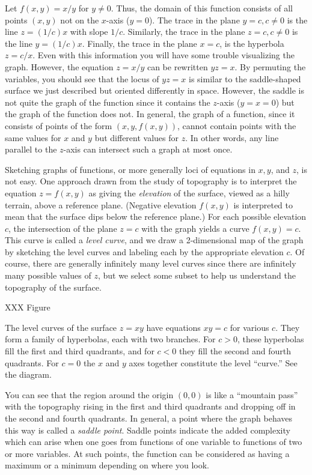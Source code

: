 \begin{example}
	 Let $f(x,y) = x/y$ for $y \not= 0$.  Thus, the domain of this
	function consists of all points $(x,y)$ not on the $x$-axis
	($y = 0$).
	The trace in the plane $y = c, c \not= 0$ is the line $z = (1/c)x$
	with slope $1/c$.   Similarly, the trace in the plane $z = c, c \not=0$
	is the line $y = (1/c)x$.  Finally, the trace in the plane $x = c$,
	is the hyperbola $z = c/x$.  Even with this information you will have
	some trouble visualizing the graph.   However, the equation
	$z = x/y$ can be rewritten $yz = x$.   By permuting the variables,
	you should see that the locus of $yz = x$
	 is similar to the  saddle-shaped surface
	we just described but oriented differently in space.  However,
	 the saddle
	is not quite the graph of the function since it  contains the 
	 $z$-axis ($y = x = 0$) but the graph of the function does not.
	In general, the graph of a function, since it consists of points
	of the form $(x,y,f(x,y))$, cannot contain points with the same
	values for $x$ and $y$ but different values for $z$.  In other words,
	any line parallel to the $z$-axis can intersect such a graph at most
	once. 
\end{example}

Sketching graphs of functions, or more generally loci of equations
in $x, y$, and $z$, is not easy.   One approach drawn from the
study of topography is to interpret the equation $z = f(x,y)$ as
giving the \emph{elevation} of the surface, viewed as a hilly
terrain, above a reference plane.  (Negative elevation
 $f(x,y)$ is
interpreted to mean that the surface dips below the reference plane.)
For each possible elevation $c$,
 the intersection of the plane $z = c$ with the graph
yields a curve $f(x,y) = c$.  This curve is called a \emph{level curve}, 
and we draw a 2-dimensional map of the graph by sketching
the level curves and labeling each by the appropriate elevation
$c$.  Of course, there are generally infinitely many level curves
since there are infinitely many possible values of $z$, but we
select some subset to help us understand the topography of the
surface.

XXX Figure

\begin{example}
	The level curves of the surface $z = xy$ have equations
	$xy = c$ for various $c$.  They form 
	a family of hyperbolas, each with two branches.  For $c > 0$,
	these hyperbolas fill the first and third quadrants, and for
	$c < 0$ they fill the second and fourth quadrants.  For $c  = 0$
	the $x$ and $y$ axes together constitute the level ``curve.''
	See the diagram.

	You can see that the region around the origin $(0,0)$ is like a
	``mountain pass'' with the topography rising in the first and
	third quadrants and dropping off in the second and fourth quadrants.
	In general, a point where the graph behaves this way is called
	a \emph{saddle point}.   Saddle points indicate the added complexity
	which can arise when one goes from functions of one variable to
	functions of two or more variables.  At such points, the function
	can be considered as having a maximum  or
	 a minimum depending on where you
	look.
\end{example}

